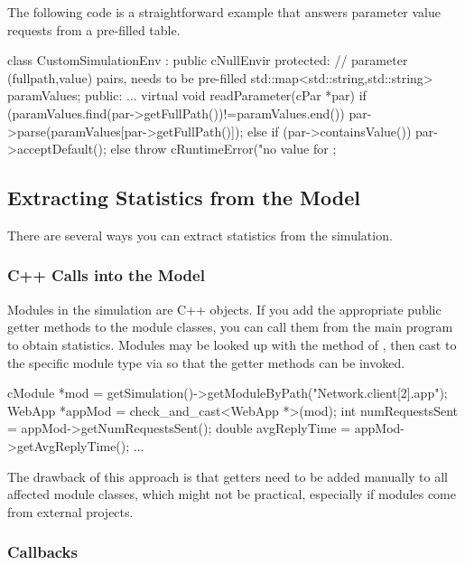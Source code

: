 The following code is a straightforward example that answers parameter
value requests from a pre-filled table.

\begin{cpp}
class CustomSimulationEnv : public cNullEnvir
{
  protected:
    // parameter (fullpath,value) pairs, needs to be pre-filled
    std::map<std::string,std::string> paramValues;
  public:
    ...
    virtual void readParameter(cPar *par) {
        if (paramValues.find(par->getFullPath())!=paramValues.end())
            par->parse(paramValues[par->getFullPath()]);
        else if (par->containsValue())
            par->acceptDefault();
        else
            throw cRuntimeError("no value for %
    }
};
\end{cpp}


\subsection{Extracting Statistics from the Model}
\label{sec:embedding:extracting-statistics}

There are several ways you can extract statistics from the
simulation.

\subsubsection{C++ Calls into the Model}
\label{sec:embedding:statistics-via-cpp-calls}

Modules in the simulation are C++ objects. If you add the appropriate
public getter methods to the module classes, you can call them from the
main program to obtain statistics. Modules may be looked up with the
 method of , then cast to the
specific module type via  so that the getter
methods can be invoked.

\begin{cpp}
cModule *mod = getSimulation()->getModuleByPath("Network.client[2].app");
WebApp *appMod = check_and_cast<WebApp *>(mod);
int numRequestsSent = appMod->getNumRequestsSent();
double avgReplyTime = appMod->getAvgReplyTime();
...
\end{cpp}

The drawback of this approach is that getters need to be added manually
to all affected module classes, which might not be practical, especially
if modules come from external projects.

\subsubsection{ Callbacks}
\label{sec:embedding:statistics-via-cenvir-callbacks}

